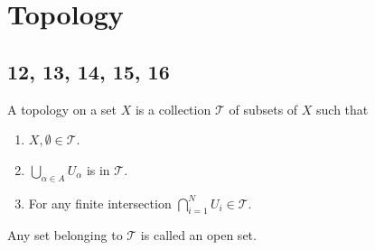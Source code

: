 \chapter{Topology}

\section{12, 13, 14, 15, 16}
\begin{defn}[topology]
    A topology on a set $X$ is a collection $\mathcal{T}$ of subsets of $X$ such that 
    \begin{enumerate}
        \item $X,\emptyset\in\mathcal{T}$.
        \item $\bigcup_{\alpha\in A}U_\alpha$ is in $\mathcal{T}$.
        \item For any finite intersection $\bigcap_{i=1}^NU_i\in\mathcal{T}$.
    \end{enumerate}
    Any set belonging to $\mathcal{T}$ is called an open set.
\end{defn}

